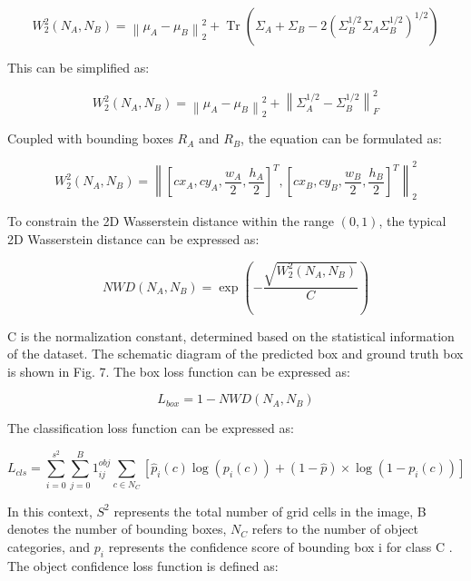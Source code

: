 \documentclass{article}
\begin{document}
\begin{equation*}
W_{2}^{2}\left(N_{A}, N_{B}\right)=\left\|\mu_{A}-\mu_{B}\right\|_{2}^{2}+\operatorname{Tr}\left(\Sigma_{A}+\Sigma_{B}-2\left(\Sigma_{B}^{1 / 2} \Sigma_{A} \Sigma_{B}^{1 / 2}\right)^{1 / 2}\right) \tag{11}
\end{equation*}


This can be simplified as:


\begin{equation*}
W_{2}^{2}\left(N_{A}, N_{B}\right)=\left\|\mu_{A}-\mu_{B}\right\|_{2}^{2}+\left\|\Sigma_{A}^{1 / 2}-\Sigma_{B}^{1 / 2}\right\|_{F}^{2} \tag{12}
\end{equation*}


Coupled with bounding boxes $R_{A}$ and $R_{B}$, the equation can be formulated as:


\begin{equation*}
W_{2}^{2}\left(N_{A}, N_{B}\right)=\left\|\left[c x_{A}, c y_{A}, \frac{w_{A}}{2}, \frac{h_{A}}{2}\right]^{T},\left[c x_{B}, c y_{B}, \frac{w_{B}}{2}, \frac{h_{B}}{2}\right]^{T}\right\|_{2}^{2} \tag{13}
\end{equation*}


To constrain the 2D Wasserstein distance within the range $(0,1)$, the typical 2D Wasserstein distance can be expressed as:


\begin{equation*}
N W D\left(N_{A}, N_{B}\right)=\exp \left(-\frac{\sqrt{W_{2}^{2}\left(N_{A}, N_{B}\right)}}{C}\right) \tag{14}
\end{equation*}


C is the normalization constant, determined based on the statistical information of the dataset. The schematic diagram of the predicted box and ground truth box is shown in Fig. 7. The box loss function can be expressed as:


\begin{equation*}
L_{b o x}=1-N W D\left(N_{A}, N_{B}\right) \tag{15}
\end{equation*}


The classification loss function can be expressed as:


\begin{equation*}
L_{c l s}=\sum_{i=0}^{s^{2}} \sum_{j=0}^{B} 1_{i j}^{o b j} \sum_{c \in N_{C}}\left[\hat{p}_{i}(c) \log \left(p_{i}(c)\right)+(1-\hat{p}) \times \log \left(1-p_{i}(c)\right)\right] \tag{16}
\end{equation*}


In this context, $S^{2}$ represents the total number of grid cells in the image, B denotes the number of bounding boxes, $N_{C}$ refers to the number of object categories, and $p_{i}$ represents the confidence score of bounding box i for class C . The object confidence loss function is defined as:
\end{document}
